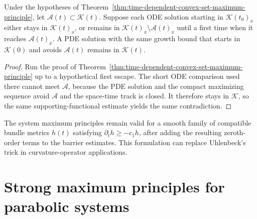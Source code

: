 \begin{theorem}
\label{thm:noncompact-system-avoidance-set-maximum-principle}

Under the hypotheses of
Theorem~\ref{thm:time-dependent-convex-set-maximum-principle}, let
$\mathcal A(t)\subset\mathcal K(t)$.  Suppose each ODE solution starting in
$\mathcal K(t_0)_x$ either stays in $\mathcal K(t)_x$, or remains in
$\mathcal K(t)_x\setminus\mathcal A(t)_x$ until a first time when it reaches
$\mathcal A(t)_x$.  A PDE solution with the same growth bound that starts in
$\mathcal K(0)$ and avoids $\mathcal A(t)$ remains in $\mathcal K(t)$.
\end{theorem}

\begin{proof}
\sketch
{}
Run the proof of
Theorem~\ref{thm:time-dependent-convex-set-maximum-principle} up to a
hypothetical first escape.  The short ODE comparison used there cannot meet
$\mathcal A$, because the PDE solution and the compact maximizing sequence
avoid $\mathcal A$ and the space-time track is closed.  It therefore stays in
$\mathcal K$, so the same supporting-functional estimate yields the same
contradiction.
\end{proof}

\begin{remark}
\label{rem:maximum-principles-time-dependent-bundle-metric}


The system maximum principles remain valid for a smooth family of compatible
bundle metrics $h(t)$ satisfying $\partial_th\geq-c_1h$, after adding the
resulting zeroth-order terms to the barrier estimates.  This formulation can
replace Uhlenbeck's trick in curvature-operator applications.
\end{remark}

\section{Strong maximum principles for parabolic systems}

